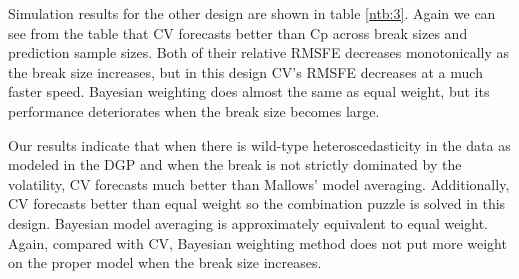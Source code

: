 Simulation results for the other design are shown in table \ref{ntb:3}. Again we can see from the table that CV forecasts better than Cp across break sizes and prediction sample sizes. Both of their relative RMSFE decreases monotonically as the break size increases, but in this design CV's RMSFE decreases at a much faster speed. Bayesian weighting does almost the same as equal weight, but its performance deteriorates when the break size becomes large.

Our results indicate that when there is wild-type heteroscedasticity in the data as modeled in the DGP and when the break is not strictly dominated by the volatility, CV forecasts much better than Mallows' model averaging. Additionally, CV forecasts better than equal weight so the combination puzzle is solved in this design. Bayesian model averaging is approximately equivalent to equal weight. Again, compared with CV, Bayesian weighting method does not put more weight on the proper model when the break size increases.
